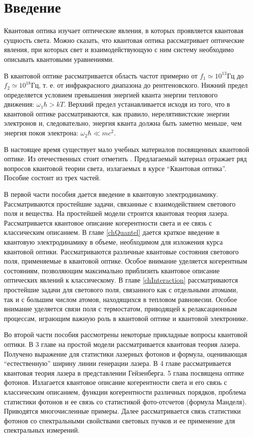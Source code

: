 \chapter*{Введение}

Квантовая оптика изучает оптические явления, в которых проявляется
квантовая сущность света. Можно сказать, что квантовая оптика
рассматривает оптические явления, при которых свет и взаимодействующую
с ним систему необходимо описывать квантовыми уравнениями. 

В квантовой оптике рассматривается область частот примерно от 
\(f_1 \simeq 10^{13} \mbox{Гц}\) до \(f_2 \simeq 10^{18}
\mbox{Гц}\), т. е. от инфракрасного диапазона до
рентгеновского. Нижний предел определяется условием превышения
энергией кванта энергии теплового движения: 
\(\omega_1 \hbar > k T\). Верхний предел
устанавливается исходя из того, что в квантовой оптике
рассматриваются, как правило, нерелятивистские энергии электронов и,
следовательно, энергия кванта должна быть заметно меньше, чем энергия
покоя электрона: \(\omega_2 \hbar \ll m c^2\).

В настоящее время существует мало учебных материалов посвященных
квантовой оптике. Из отечественных стоит отметить 
\cite{bTarasovQuantumOpticsIntro2008}.  Предлагаемый материал отражает
ряд вопросов квантовой теории света, излагаемых в курсе ``Квантовая
оптика''. Пособие состоит из трех частей. 

В первой части пособия дается введение в квантовую
электродинамику. Рассматриваются простейшие задачи, связанные с
взаимодействием светового поля и вещества. На простейшей модели
строится квантовая теория лазера. Рассматривается квантовое описание
когерентности света и ее связь с классическим описанием. 
В главе \ref{chQuantel} дается краткое введение в квантовую
электродинамику в объеме, необходимом для изложения курса квантовой
оптики. Рассматриваются различные квантовые состояния светового поля,
применяемые в квантовой оптике. Особое внимание уделяется когерентным
состояниям, позволяющим максимально приблизить квантовое описание
оптических явлений к классическому. 
В главе \ref{chInteraction} рассматриваются простейшие задачи для
светового поля, 
связанного как с отдельными атомами, так и с большим числом атомов,
находящихся в тепловом равновесии. Особое внимание уделяется
связи поля с термостатом, приводящей к релаксационным процессам,
играющим важную роль в квантовой оптике и квантовой
электронике.

Во второй части пособия рассмотрены некоторые прикладные вопросы
квантовой оптики. В 3 главе на простой модели рассматривается квантовая теория
лазера. Получено выражение для статистики лазерных фотонов и формула,
оценивающая ``естественную'' ширину линии генерации лазера. 
В 4 главе рассматривается квантовая теория лазера в представлении
Гейзенберга. 
5 глава посвящена оптике фотонов. Излагается квантовое описание
когерентности света и его связь с классическим описанием, функции
когерентности различных порядков, проблема статистики фотонов и ее
связь со статистикой фото-отсчетов (формула Манделя). Приводятся
многочисленные примеры. Далее рассматривается связь статистики фотонов
со спектральными свойствами световых пучков и ее применение для
спектральных измерений.

